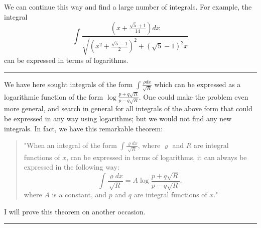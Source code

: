 \documentclass[oneside, 12 pt, leqno]{memoir}
\begin{document}
We can continue this way and find a large number of integrals. For example, the integral
\[\int \frac{\left(x+\frac{\sqrt{5}+1}{14}\right) d x}{\sqrt{\left(x^2+\frac{\sqrt{5}-1}{2}\right)^2+(\sqrt{5}-1)^2 x}}\]
can be expressed in terms of logarithms.
\begin{center}\rule{2in}{0.1pt}\end{center}

We have here sought integrals of the form \(\int \frac{\rho dx}{\sqrt{R}}\) which can be expressed as a logarithmic function of the form \(\log \frac{p+q \sqrt{R}}{p-q \sqrt{R}}\). One could make the problem even more general, and search in general for all integrals of the above form that could be expressed in any way using logarithms; but we would not find any new integrals. In fact, we have this remarkable theorem:

\begin{quote}"When an integral of the form \(\int \frac{\varrho d x}{\sqrt{R}}\), where \(\varrho\) and \(R\) are integral functions of \(x\), can be expressed in terms of logarithms, it can always be expressed in the following way:
\[\int \frac{\varrho d x}{\sqrt{R}}=A \log \frac{p+q \sqrt{R}}{p-q \sqrt{R}},\]
where \(A\) is a constant, and \(p\) and \(q\) are integral functions of \(x\)." \end{quote}

I will prove this theorem on another occasion.

\begin{center}\rule{2in}{0.1pt}\end{center}
\vfill
\end{document}
